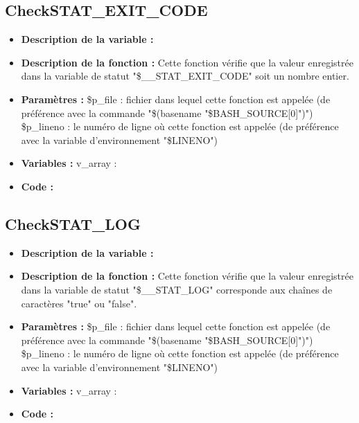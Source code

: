 \documentclass[a4paper,10pt]{article}
\begin{document}
\subsection{CheckSTAT\_EXIT\_CODE}
\begin{itemize}
    \item \textbf{Description de la variable :}

    \item \textbf{Description de la fonction :} Cette fonction vérifie que la valeur enregistrée dans la variable de statut "\$\_\_STAT\_EXIT\_CODE" soit un nombre entier.

    \item \textbf{Paramètres :} \$p\_file : fichier dans lequel cette fonction est appelée (de préférence avec la commande "\$(basename "\$BASH\_SOURCE[0]")")
    \$p\_lineno : le numéro de ligne où cette fonction est appelée (de préférence avec la variable d'environnement "\$LINENO")

    \item \textbf{Variables :} v\_array :

    \item \textbf{Code :}
\end{itemize}

\subsection{CheckSTAT\_LOG}
\begin{itemize}
    \item \textbf{Description de la variable :}

    \item \textbf{Description de la fonction :} Cette fonction vérifie que la valeur enregistrée dans la variable de statut "\$\_\_STAT\_LOG" corresponde aux chaînes de caractères "true" ou "false".

    \item \textbf{Paramètres :} \$p\_file : fichier dans lequel cette fonction est appelée (de préférence avec la commande "\$(basename "\$BASH\_SOURCE[0]")")
    \$p\_lineno : le numéro de ligne où cette fonction est appelée (de préférence avec la variable d'environnement "\$LINENO")

    \item \textbf{Variables :} v\_array :

    \item \textbf{Code :}
\end{itemize}
\end{document}
